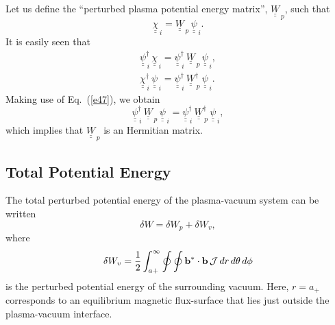 \documentclass[12pt,prb,aps]{revtex4-1}
\begin{document}
Let us define the ``perturbed plasma potential energy matrix'', $\underline{\underline{W}}_{\,p}$, such that 
\begin{equation}\label{e48}
\underline{\underline{\chi}}_{\,i} = \underline{\underline{W}}_{\,p}\,\underline{\underline{\psi}}_{\,i}.
\end{equation}
 It is easily seen that
 \begin{align}
 \underline{\underline{\psi}}^{\dag}_{\,i}\,\underline{\underline{\chi}}_{\,i}= \underline{\underline{\psi}}^{\dag}_{\,i}\,\underline{\underline{W}}_{\,p}\,
 \underline{\underline{\psi}}_{\,i},\\[0.5ex]
 \underline{\underline{\chi}}^{\dag}_{\,i}\,\underline{\underline{\psi}}_{\,i}= \underline{\underline{\psi}}^{\dag}_{\,i}\,\underline{\underline{W}}_{\,p}^{\dag}\,
 \underline{\underline{\psi}}_{\,i}.
 \end{align}
 Making use of Eq.~(\ref{e47}), we obtain
 \begin{equation}
 \underline{\underline{\psi}}^{\dag}_{\,i}\,\underline{\underline{W}}_{\,p}\,
 \underline{\underline{\psi}}_{\,i}=
 \underline{\underline{\psi}}^{\dag}_{\,i}\,\underline{\underline{W}}_{\,p}^{\dag}\,
 \underline{\underline{\psi}}_{\,i},
 \end{equation}
 which implies that $\underline{\underline{W}}_{\,p}$ is an Hermitian matrix. 

\subsection{Total Potential Energy}
The total perturbed potential energy of the plasma-vacuum system can be written\,\cite{freidberg,ideal}
\begin{equation}\label{e79}
\delta W= \delta W_p + \delta W_v,
\end{equation}
where
\begin{equation}
\delta W_v = \frac{1}{2}\int_{a+}^\infty\oint\oint {\bf b}^\ast\cdot{\bf b} \,{\cal J}\,dr\,d\theta\,d\phi
\end{equation}
is the perturbed potential energy of the surrounding vacuum.\cite{freidberg,ideal} Here, $r=a_+$ corresponds to an equilibrium magnetic flux-surface that lies just outside the plasma-vacuum interface. 
\end{document}
